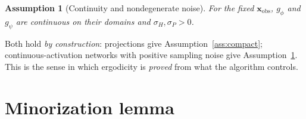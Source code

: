 \documentclass[11pt]{article}
\theoremstyle{definitionbreak}
\newtheorem{assumption}{Assumption}
\theoremstyle{plainbreak}
\theoremstyle{remarkbreak}
\newcommand{\xobs}{\bm{x}_{\mathrm{obs}}}
\begin{document}
\begin{assumption}[Continuity and nondegenerate noise]
\label{ass:cont}
For the fixed $\xobs$, $g_\phi$ and $g_\psi$ are continuous on their domains and
$\sigma_H,\sigma_P>0$.
\end{assumption}

\noindent Both hold \emph{by construction}: projections give Assumption~\ref{ass:compact};
continuous-activation networks with positive sampling noise give Assumption~\ref{ass:cont}. This is
the sense in which ergodicity is \emph{proved} from what the algorithm controls.

\section{Minorization lemma}
\label{sec:lemma}
\end{document}
